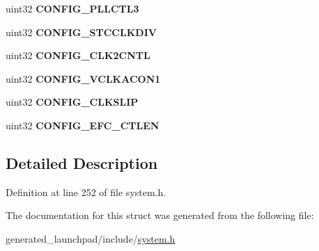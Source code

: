 \begin{DoxyCompactItemize}
uint32 {\bfseries C\+O\+N\+F\+I\+G\+\_\+\+P\+L\+L\+C\+T\+L3}
\item 
\mbox{\label{structsystem__config__reg_ae949bec7b08c4f760600d9831dcafaa4}} 
uint32 {\bfseries C\+O\+N\+F\+I\+G\+\_\+\+S\+T\+C\+C\+L\+K\+D\+IV}
\item 
\mbox{\label{structsystem__config__reg_a531debcbaaea108d2ed5add631c1c35a}} 
uint32 {\bfseries C\+O\+N\+F\+I\+G\+\_\+\+C\+L\+K2\+C\+N\+TL}
\item 
\mbox{\label{structsystem__config__reg_a524f09a691b864b634d428351aa4e30e}} 
uint32 {\bfseries C\+O\+N\+F\+I\+G\+\_\+\+V\+C\+L\+K\+A\+C\+O\+N1}
\item 
\mbox{\label{structsystem__config__reg_a184f7cd027a0de1836b139dc35aab48a}} 
uint32 {\bfseries C\+O\+N\+F\+I\+G\+\_\+\+C\+L\+K\+S\+L\+IP}
\item 
\mbox{\label{structsystem__config__reg_a86dc5753f1418224d0fa310a9ff849d8}} 
uint32 {\bfseries C\+O\+N\+F\+I\+G\+\_\+\+E\+F\+C\+\_\+\+C\+T\+L\+EN}
\end{DoxyCompactItemize}


\subsection{Detailed Description}


Definition at line 252 of file system.\+h.



The documentation for this struct was generated from the following file\+:\begin{DoxyCompactItemize}
\item 
generated\+\_\+launchpad/include/\mbox{\hyperlink{system_8h}{system.\+h}}\end{DoxyCompactItemize}
